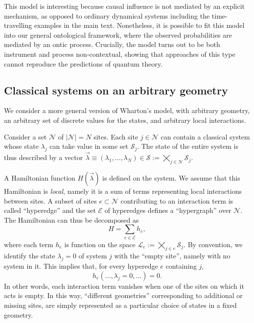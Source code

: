 \documentclass[a4paper,onecolumn,11pt,accepted=2018-05-04]{quantumarticle}
\begin{document}
This model is interesting because causal influence is not mediated by an explicit mechanism, as opposed to ordinary dynamical systems including the time-travelling examples in the main text. Nonetheless, it is possible to fit this model into our general ontological framework, where the observed probabilities are mediated by an ontic process. Crucially, the model turns out to be both instrument and process non-contextual, showing that approaches of this type cannot reproduce the predictions of quantum theory.

\subsection*{Classical systems on an arbitrary geometry}
We consider a more general version of Wharton's model, with arbitrary geometry, an arbitrary set of discrete values for the states, and arbitrary local interactions.

Consider a set $\mathcal{N}$ of $\left|\mathcal{N}\right|=N$ sites. Each site $j\in\mathcal{N}$ can contain a classical system whose state $\lambda_j$ can take value in some set $\mathcal{S}_j$. %
The state of the entire system is thus described by a vector $\vec{\lambda}\equiv\left(\lambda_1,\dots,\lambda_N\right)\in \mathcal{S}:=\bigtimes_{j\in\mathcal{N}}\mathcal{S}_j$.

A Hamiltonian function $H(\vec{\lambda})$ is defined on the system.
We assume that this Hamiltonian is \emph{local}, namely it is a sum of terms representing local interactions between sites. A subset of sites $e\subset \mathcal{N}$ contributing to an interaction term is called ``hyperedge'' and the set $\mathcal{E}$ of hyperedges defines a ``hypergraph'' over $\mathcal{N}$. The Hamiltonian can thus be decomposed as
\begin{equation}
H=\sum_{e\in\mathcal{E}} h_e,
\label{local}
\end{equation}
where each term $h_e$ is function on the space $\mathcal{L}_e:=\bigtimes_{j\in e}\mathcal{S}_j$. By convention, we identify the state $\lambda_j=0$ of system $j$ with the ``empty site'', namely with no system in it. This implies that, for every hyperedge $e$ containing $j$, 
\begin{equation}
h_e\left(\dots,\lambda_j=0,\dots\right)=0.
\label{void}
\end{equation}
In other words, each interaction term vanishes when one of the sites on which it acts is empty. In this way, ``different geometries'' corresponding to additional or missing sites, are simply represented as a particular choice of states in a fixed geometry.
 
\end{document}
